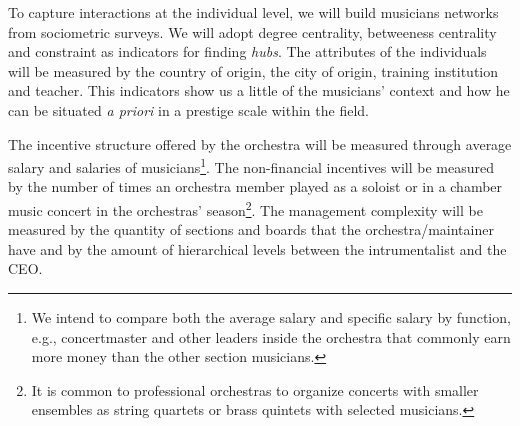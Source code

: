 \documentclass[a4paper, 12pt, openright, oneside, german, french, brazil, english, article]{abntex2}
\begin{document}
	
	To capture interactions at the individual level, we will build musicians networks from sociometric surveys. We will adopt degree centrality, betweeness centrality and constraint as indicators for finding \textit{hubs}. The attributes of the individuals will be measured by the country of origin, the city of origin, training institution and teacher. This indicators show us a little of the musicians' context and how he can be situated \textit{a priori} in a prestige scale within the field.
	
	
	The incentive structure offered by the orchestra will be measured through average salary and salaries of musicians\footnote{We intend to compare both the average salary and specific salary by function, e.g., concertmaster and other leaders inside the orchestra that commonly earn more money than the other section musicians.}. The non-financial incentives will be measured by the number of times an orchestra member played as a soloist or in a chamber music concert in the orchestras' season\footnote{It is common to professional orchestras to organize concerts with smaller ensembles as string quartets or brass quintets with selected musicians.}. The management complexity will be measured by the quantity of sections and boards that the orchestra/maintainer have and by the amount of hierarchical levels between the intrumentalist and the CEO.
	
\end{document}
